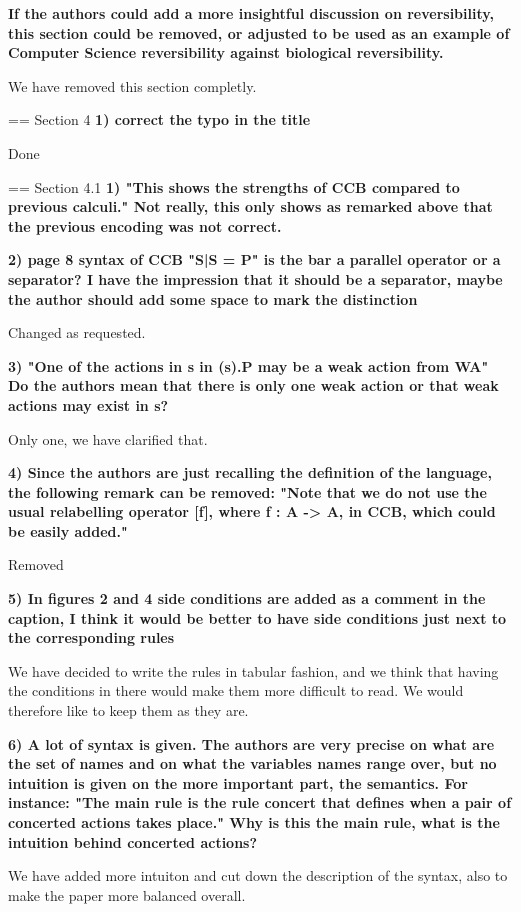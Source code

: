 \documentclass{article}
\begin{document}
\textbf{If the authors could add a more insightful discussion on reversibility, this section could be removed, or adjusted to be used as an example of Computer Science reversibility against biological reversibility.}

We have removed this section completly.

== Section 4
\textbf{1) correct the typo in the title}

Done

== Section 4.1
\textbf{1) "This shows the strengths of CCB compared to previous calculi."
Not really, this only shows as remarked above that the previous encoding was not correct.}

\textbf{2) page 8 syntax of CCB "S|S = P" is the bar a parallel operator or a separator? 
I have the impression that it should be a separator, maybe the author should add some space to mark the distinction}

Changed as requested.

\textbf{3) "One of the actions in s in (s).P may be a weak action from WA" Do the authors mean that there is only one weak action or that weak actions may exist in s?}

Only one, we have clarified that.

\textbf{4) Since the authors are just recalling the definition of the language, the following remark can be removed:
"Note that we do not use the usual relabelling operator [f], where f : A -> A, in CCB, which could be easily added."}

Removed

\textbf{5) In figures 2 and 4 side conditions are added as a comment in the caption, I think it would be better to have side conditions just next to the corresponding rules}

We have decided to write the rules in tabular fashion, and we think that having the conditions in there would make them more difficult to read. We would therefore like to keep them as they are.

\textbf{6) A lot of syntax is given.  The authors are very precise on what are the set of names and on what the variables names range over, but no intuition is given on the more important part, the semantics.
For instance: "The main rule is the rule concert that defines when a pair of concerted actions takes place." Why is this the main rule, what is the intuition behind concerted actions?}

We have added more intuiton and cut down the description of the syntax, also to make the paper more balanced overall.
\end{document}

